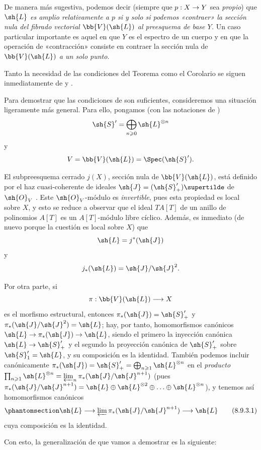 \documentclass[oneside,10pt]{amsart}
\makeatletter
\renewcommand{\geq}{\geqslant}
\newcommand{\ega@arrow}[2]{\mathchoice{#1}{#2}{#2}{#2}}
\renewcommand{\to}{\ega@arrow{\longrightarrow}{\rightarrow}}
\let\EGAOriginalLabel\label
\renewcommand{\label}[1]{\phantomsection\EGAOriginalLabel{#1}}
\makeatother
\begin{document}
De manera más sugestiva, podemos decir (siempre que $p:X\to Y$ sea \emph{propio}) que \emph{$\sh{L}$ es amplio relativamente a $p$ si y solo si podemos «\emph{contraer}» la sección nula del fibrado vectorial $\bb{V}(\sh{L})$ al preesquema de base $Y$.}
Un caso particular importante es aquel en que $Y$ es el espectro de un cuerpo y en que la operación de «contracción» consiste en contraer la sección nula de $\bb{V}(\sh{L})$ \emph{a un solo punto}.

\begin{env}[8.9.3]
\label{II.8.9.3}
Tanto la necesidad de las condiciones del Teorema  como el Corolario  se siguen inmediatamente de  y .

Para demostrar que las condiciones de  son suficientes, consideremos una situación ligeramente más general.
Para ello, pongamos (con las notaciones de )
\[
  \sh{S}'=\bigoplus_{n\geq 0}\sh{L}^{\otimes n}
\]
y
\[
  V=\bb{V}(\sh{L})=\Spec(\sh{S}').
\]

El subpreesquema cerrado $j(X)$, sección nula de $\bb{V}(\sh{L})$, está definido por el haz cuasi-coherente de ideales $\sh{J}=(\sh{S}'_+)\supertilde$ de $\sh{O}_V$ .
Este $\sh{O}_V$-módulo es \emph{invertible}, pues esta propiedad es local sobre $X$, y esto se reduce a observar que el ideal $TA[T]$ de un anillo de polinomios $A[T]$ es un $A[T]$-módulo libre cíclico.
Además, es inmediato (de nuevo porque la cuestión es local sobre $X$) que
\[
  \sh{L}=j^*(\sh{J})
\]
y
\[
  j_*(\sh{L})=\sh{J}/\sh{J}^2.
\]

Por otra parte, si
\[
  \pi:\bb{V}(\sh{L})\to X
\]
es el morfismo estructural, entonces $\pi_*(\sh{J})=\sh{S}'_+$ y $\pi_*(\sh{J}/\sh{J}^2)=\sh{L}$;
hay, por tanto, homomorfismos canónicos $\sh{L}\to\pi_*(\sh{J})\to\sh{L}$, siendo el primero la inyección canónica $\sh{L}\to\sh{S}'_+$ y el segundo la proyección canónica de $\sh{S}'_+$ sobre $\sh{S}'_1=\sh{L}$, y su composición es la identidad.
También podemos incluir canónicamente $\pi_*(\sh{J}) = \sh{S}'_+ = \bigoplus_{n\geq1}\sh{L}^{\otimes n}$ en el \emph{producto} $\prod_{n\geq1}\sh{L}^{\otimes n} = \varprojlim_n \pi_*(\sh{J}/\sh{J}^{n+1})$ (pues $\pi_*(\sh{J}/\sh{J}^{n+1}) = \sh{L}\oplus\sh{L}^{\otimes 2}\oplus\ldots\oplus\sh{L}^{\otimes n}$), y tenemos así homomorfismos canónicos
\[
\label{II.8.9.3.1}
  \sh{L}\to\varprojlim\pi_*(\sh{J}/\sh{J}^{n+1})\to\sh{L}
  \tag{8.9.3.1}
\]
cuya composición es la identidad.

Con esto, la generalización de  que vamos a demostrar es la siguiente:
\end{env}
\end{document}
